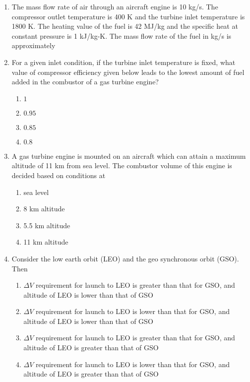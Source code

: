 \documentclass[journal,12pt,onecolumn]{IEEEtran}
\theoremstyle{remark}
\begin{document}
\begin{enumerate}
    \item The mass flow rate of air through an aircraft engine is 10 kg/s. The compressor outlet temperature is 400 K and the turbine inlet temperature is 1800 K. The heating value of the fuel is 42 MJ/kg and the specific heat at constant pressure is 1 kJ/kg-K. The mass flow rate of the fuel in kg/s is approximately \underline{\hspace{2cm}}

    \item For a given inlet condition, if the turbine inlet temperature is fixed, what value of compressor efficiency given below leads to the lowest amount of fuel added in the combustor of a gas turbine engine?
    \begin{enumerate}
        \item $1$
        \item $0.95$
        \item $0.85$
        \item $0.8$
    \end{enumerate}

    \item A gas turbine engine is mounted on an aircraft which can attain a maximum altitude of 11 km from sea level. The combustor volume of this engine is decided based on conditions at 
    \begin{enumerate}
        \item sea level
        \item 8 km altitude
        \item 5.5 km altitude
        \item 11 km altitude
    \end{enumerate}

    \item Consider the low earth orbit (LEO) and the geo synchronous orbit (GSO). Then 

    \begin{enumerate}
        \item $\Delta V$ requirement for launch to LEO is greater than that for GSO, and altitude of LEO is lower than that of GSO 
        \item $\Delta V$ requirement for launch to LEO is lower than that for GSO, and altitude of LEO is lower than that of GSO         
        \item $\Delta V$ requirement for launch to LEO is greater than that for GSO, and altitude of LEO is greater than that of GSO 
        \item $\Delta V$ requirement for launch to LEO is lower than that for GSO, and altitude of LEO is greater than that of GSO         
    \end{enumerate}


\end{enumerate}
\end{document}
